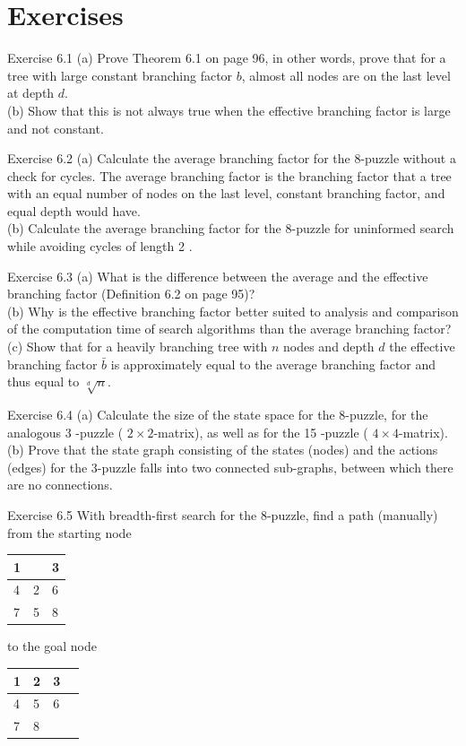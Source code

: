 \documentclass[10pt]{book}
\begin{document}
\section{Exercises}
Exercise 6.1
(a) Prove Theorem 6.1 on page 96, in other words, prove that for a tree with large constant branching factor $b$, almost all nodes are on the last level at depth $d$.\\
(b) Show that this is not always true when the effective branching factor is large and not constant.

Exercise 6.2
(a) Calculate the average branching factor for the 8-puzzle without a check for cycles. The average branching factor is the branching factor that a tree with an equal number of nodes on the last level, constant branching factor, and equal depth would have.\\
(b) Calculate the average branching factor for the 8-puzzle for uninformed search while avoiding cycles of length 2 .

Exercise 6.3
(a) What is the difference between the average and the effective branching factor (Definition 6.2 on page 95)?\\
(b) Why is the effective branching factor better suited to analysis and comparison of the computation time of search algorithms than the average branching factor?\\
(c) Show that for a heavily branching tree with $n$ nodes and depth $d$ the effective branching factor $\bar{b}$ is approximately equal to the average branching factor and thus equal to $\sqrt[d]{n}$.

Exercise 6.4
(a) Calculate the size of the state space for the 8-puzzle, for the analogous 3 -puzzle ( $2 \times 2$-matrix), as well as for the 15 -puzzle ( $4 \times 4$-matrix).\\
(b) Prove that the state graph consisting of the states (nodes) and the actions (edges) for the 3-puzzle falls into two connected sub-graphs, between which there are no connections.

Exercise 6.5 With breadth-first search for the 8-puzzle, find a path (manually) from the starting node

\begin{center}
\begin{tabular}{|l|l|l|}
\hline
1 &  & 3 \\
\hline
4 & 2 & 6 \\
\hline
7 & 5 & 8 \\
\hline
\end{tabular}
\end{center} to the goal node \begin{tabular}{|l|l|l|l|}
\hline
1 & 2 & 3 \\
\hline
4 & 5 & 6 \\
\hline
7 & 8 &  \\
\hline
\end{tabular}
\end{document}
